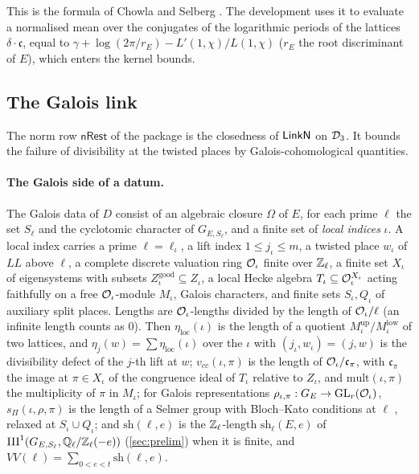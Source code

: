 This is the formula of Chowla and Selberg \cite{ChowlaSelberg1967}. The development uses it to evaluate a
normalised mean over the conjugates of the logarithmic periods of the lattices $\delta\cdot\mathfrak c$, equal to
$\gamma+\log(2\pi/r_E)-L'(1,\chi)/L(1,\chi)$ ($r_E$ the root discriminant of $E$), which enters the kernel bounds.

\subsection{The Galois link}\label{sec:families:galois}

The norm row $\mathsf{nRest}$ of the package is the closedness of $\mathsf{LinkN}$ on $\mathcal{D}_3$. It bounds
the failure of divisibility at the twisted places by Galois-cohomological quantities.

\paragraph{The Galois side of a datum.}
The Galois data of $D$ consist of an algebraic closure $\Omega$ of $E$, for each prime $\ell$ the set $S_\ell$ and
the cyclotomic character of $G_{E,S_\ell}$, and a finite set of \emph{local indices} $\iota$. A local index carries
a prime $\ell=\ell_\iota$, a lift index $1\le j_\iota\le m$, a twisted place $w_\iota$ of $\mathit{LL}$ above $\ell$,
a complete discrete valuation ring $\mathcal{O}_\iota$ finite over $\mathbb{Z}_\ell$, a finite set $X_\iota$ of eigensystems with
subsets $Z^{\mathrm{good}}_\iota\subseteq Z_\iota$, a local Hecke algebra $T_\iota\subseteq\mathcal{O}_\iota^{X_\iota}$ acting
faithfully on a free $\mathcal{O}_\iota$-module $M_\iota$, Galois characters, and finite sets $S_\iota,Q_\iota$ of auxiliary
split places. Lengths are $\mathcal{O}_\iota$-lengths divided by the length of $\mathcal{O}_\iota/\ell$ (an infinite length counts as
$0$). Then $\eta_{\mathrm{loc}}(\iota)$ is the length of a quotient $M^{\mathrm{up}}_\iota/M^{\mathrm{low}}_\iota$ of
two lattices, and $\eta_j(w)=\sum\eta_{\mathrm{loc}}(\iota)$ over the $\iota$ with $(j_\iota,w_\iota)=(j,w)$ is the
divisibility defect of the $j$-th lift at $w$; $v_{cc}(\iota,\pi)$ is the length of $\mathcal{O}_\iota/\mathfrak c_\pi$, with
$\mathfrak c_\pi$ the image at $\pi\in X_\iota$ of the congruence ideal of $T_\iota$ relative to $Z_\iota$, and
$\mathrm{mult}(\iota,\pi)$ the multiplicity of $\pi$ in $M_\iota$; for Galois representations
$\rho_{\iota,\pi}:G_E\to\operatorname{GL}_r(\mathcal{O}_\iota)$, $s_\Pi(\iota,\rho,\pi)$ is the length of a Selmer group with Bloch--Kato
conditions at $\ell$ \cite{BlochKato1990}, relaxed at $S_\iota\cup Q_\iota$; and $\mathrm{sh}(\ell,e)$ is the
$\mathbb{Z}_\ell$-length $\mathrm{sh}_\ell(E,e)$ of $\mathrm{III}^1(G_{E,S_\ell},\mathbb{Q}_\ell/\mathbb{Z}_\ell(-e))$ (\cref{sec:prelim}) when it is finite, and
$VV(\ell)=\sum_{0<e<t}\mathrm{sh}(\ell,e)$.

